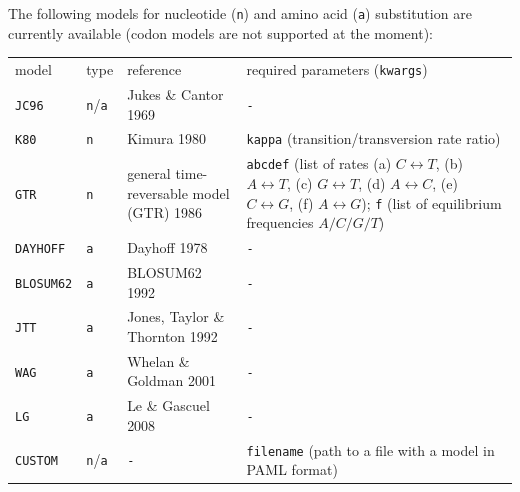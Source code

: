 \documentclass[hidelinks,11pt]{article}
\begin{document}
The following models for nucleotide (\texttt{n}) and amino acid (\texttt{a}) substitution are currently available (codon models are not supported at the moment):

\vspace{3mm}
{\small\centering
	\begin{longtable}{ p{1.5cm} p{1.0cm} p{5.5cm} p{5.5cm}}
		model & type & reference & required parameters (\texttt{kwargs})\\
		\texttt{JC96} & \texttt{n}/\texttt{a} & Jukes \& Cantor 1969 \citep{jukes1969} & \texttt{-}\\
		\texttt{K80} & \texttt{n} & Kimura 1980 \citep{kimura1980} & \texttt{kappa} (transition/transversion rate ratio)\\
		\texttt{GTR} & \texttt{n} & general time-reversable model (GTR) 1986 \citep{tavare1986} & \texttt{abcdef} (list of rates (a) $C\leftrightarrow T$, (b) $A\leftrightarrow T$, (c) $G\leftrightarrow T$, (d) $A\leftrightarrow C$, (e) $C\leftrightarrow G$, (f) $A\leftrightarrow G$);\newline
		\texttt{f} (list of equilibrium frequencies $A/C/G/T$)\\
		\texttt{DAYHOFF} & \texttt{a} & Dayhoff 1978 \citep{dayhoff1978} & \texttt{-}\\
		\texttt{BLOSUM62} & \texttt{a} & BLOSUM62 1992 \citep{henikoff1992} & \texttt{-}\\
		\texttt{JTT} & \texttt{a} & Jones, Taylor \& Thornton 1992 \citep{jones1992} & \texttt{-}\\
		\texttt{WAG} & \texttt{a} & Whelan \& Goldman 2001 \citep{whelan2001} & \texttt{-}\\
		\texttt{LG} & \texttt{a} & Le \& Gascuel 2008 \citep{le2008} & \texttt{-}\\
		\texttt{CUSTOM} & \texttt{n}/\texttt{a} & \texttt{-} & \texttt{filename} (path to a file with a model in PAML \citep{yang1997} format)\\
	\end{longtable}
}
\vspace{3mm}
\end{document}
